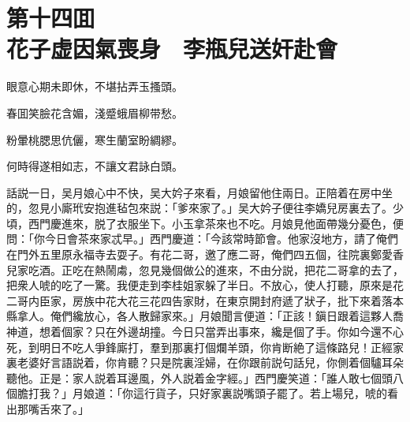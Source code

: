 
\chapter*{第十四囬　\\花子虚因氣喪身　李瓶兒送奸赴會}


\begin{myquote}
眼意心期未即休，不堪拈弄玉搔頭。

春囬笑臉花含媚，淺蹙蛾眉柳带愁。

粉暈桃腮思伉儷，寒生蘭室盼綢繆。

何時得遂相如志，不讓文君詠白頭。
\end{myquote}

話説一日，吴月娘心中不快，吴大妗子來看，月娘留他住兩日。正陪着在房中坐的，忽見小廝玳安抱進毡包來説：「爹來家了。」吴大妗子便往李嬌兒房裏去了。少頃，西門慶進來，脱了衣服坐下。小玉拿茶來也不吃。月娘見他面帶幾分憂色，便問：「你今日會茶來家忒早。」西門慶道：「今該常時節會。他家沒地方，請了俺們在門外五里原永福寺去耍子。有花二哥，邀了應二哥，俺們四五個，往院裏鄭愛香兒家吃酒。正吃在熱鬧䖏，忽見幾個做公的進來，不由分説，把花二哥拿的去了，把衆人唬的吃了一驚。我便走到李桂姐家躲了半日。不放心，使人打聽，原來是花二哥内臣家，房族中花大花三花四告家財，在東京開封府遞了狀子，批下來着落本縣拿人。俺們纔放心，各人散歸家來。」月娘聞言便道：「正該！鎭日跟着這夥人喬神道，想着個家？只在外邊胡撞。今日只當弄出事來，纔是個了手。你如今還不心死，到明日不吃人爭鋒廝打，羣到那裏打個爛羊頭，你肯断絶了這條路兒！正經家裏老婆好言語説着，你肯聽？只是院裏淫婦，在你跟前説句話兒，你側着個驢耳朵聽他。正是：家人説着耳邊風，外人説着金字經。」西門慶笑道：「誰人敢七個頭八個膽打我？」月娘道：「你這行貨子，只好家裏説嘴頭子罷了。若上場兒，唬的看出那嘴舌來了。」

